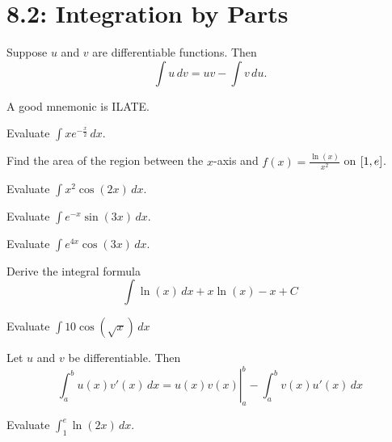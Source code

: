 \documentclass[../mathNotesPreamble]{subfiles}
\begin{document}
  \section{8.2: Integration by Parts}
  \begin{thmBox*}
    Suppose $u$ and $v$ are differentiable functions. Then
      \[\int u\,dv=uv-\int v\,du.\]
  \end{thmBox*}
  A good mnemonic is ILATE.
  \pagebreak

  \begin{ex*}
    Evaluate $\displaystyle\int xe^{-\frac{x}{2}}\,dx$.
  \end{ex*}
  \pagebreak

  \begin{ex*}
    Find the area of the region between the $x$-axis and $f(x)=\displaystyle\frac{\ln(x)}{x^2}$ on ${\left[1,e\right]}$.
  \end{ex*}
  \pagebreak

  \begin{ex*}
    Evaluate $\displaystyle\int x^2 \cos(2x)\,dx$.
  \end{ex*}
  \pagebreak

  \begin{ex*}
    Evaluate $\displaystyle\int e^{-x}\sin(3x)\,dx$.
  \end{ex*}
  \pagebreak

  \begin{ex*}
    Evaluate $\displaystyle\int e^{4x}\cos(3x)\,dx$.
  \end{ex*}
  \pagebreak

  \begin{ex*}
    Derive the integral formula 
      \[\int \ln(x)\,dx+x\ln(x)-x+C\]
  \end{ex*}

  \begin{ex*}
    Evaluate $\displaystyle\int10\cos(\sqrt{x})\,dx$
  \end{ex*}
  \pagebreak

  \begin{thmBox*}
    Let $u$ and $v$ be differentiable. Then
      \[\left.\int_a^b u(x) v'(x)\,dx= u(x)v(x)\right|_a^b -\int_a^b v(x)u'(x)\,dx\]
  \end{thmBox*}
  \begin{ex*}
    Evaluate $\displaystyle \int_1^e \ln(2x)\,dx$.
  \end{ex*}
  \pagebreak
\end{document}
